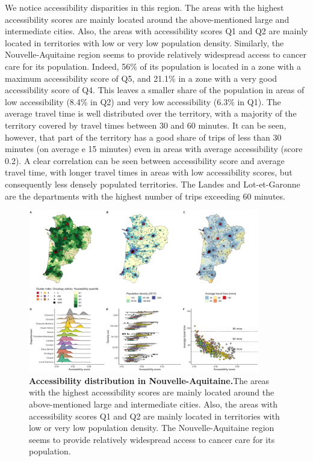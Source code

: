 We notice accessibility disparities in this region. The areas with the highest
accessibility scores are mainly located around the above-mentioned large and
intermediate cities. Also, the areas with accessibility scores Q1 and Q2 are
mainly located in territories with low or very low population density.
Similarly, the Nouvelle-Aquitaine region seems to provide relatively widespread
access to cancer care for its population. Indeed, 56\% of its population is
located in a zone with a maximum accessibility score of Q5, and 21.1\% in a zone
with a very good accessibility score of Q4. This leaves a smaller share of the
population in areas of low accessibility (8.4\% in Q2) and very low
accessibility (6.3\% in Q1). The average travel time is well distributed over
the territory, with a majority of the territory covered by travel times between
30 and 60 minutes. It can be seen, however, that part of the territory has a
good share of trips of less than 30 minutes (on average e 15 minutes) even in
areas with average accessibility (score 0.2). A clear correlation can be seen
between accessibility score and average travel time, with longer travel times in
areas with low accessibility scores, but consequently less densely populated
territories. The Landes and Lot-et-Garonne are the departments with the highest
number of trips exceeding 60 minutes.

\begin{figure}[H]
    \includegraphics[width=0.9\textwidth]{images/camion/region_accessibility/accessibility_Nouvelle-Aquitaine.png}
    \centering
    \caption{
        \textbf{Accessibility distribution in Nouvelle-Aquitaine.}The areas with the highest accessibility scores are mainly located around the
        above-mentioned large and intermediate cities. Also, the areas with
        accessibility scores Q1 and Q2 are mainly located in territories with low or
        very low population density. The Nouvelle-Aquitaine region seems to
        provide relatively widespread access to cancer care for its population.
    }
\end{figure}

